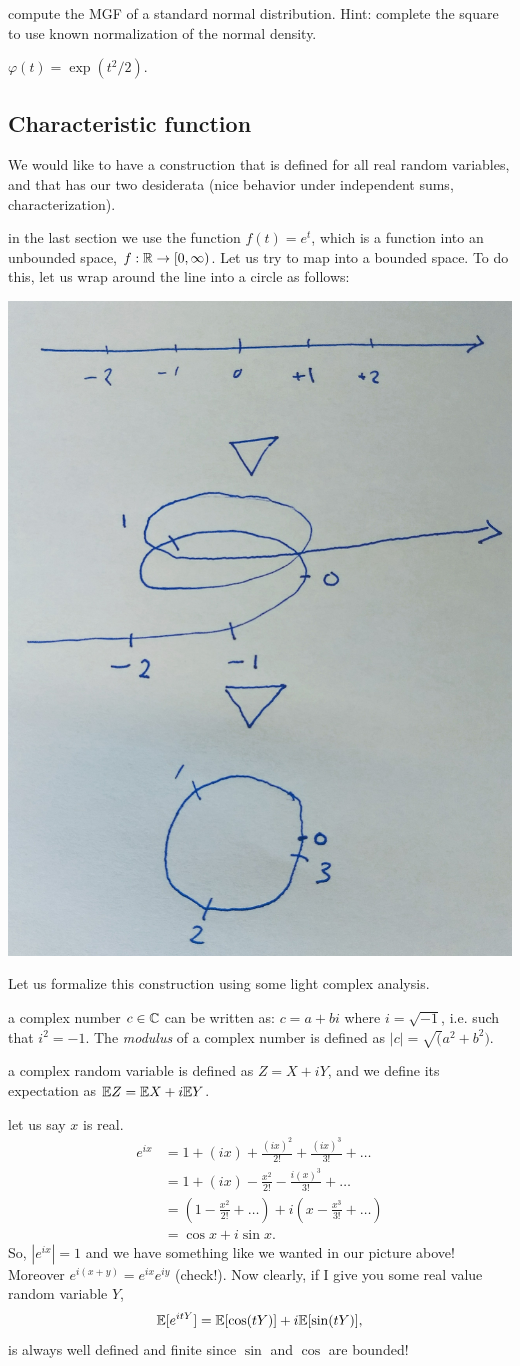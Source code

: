 \documentclass{article}
\begin{document}
 compute the MGF of a standard normal distribution. Hint: complete the square to use known normalization of the normal density.

 $\varphi(t) = \exp(t^2 / 2)$. 


\subsection{Characteristic function}

We would like to have a construction that is defined for all real random variables, and that has our two desiderata (nice behavior under independent sums, characterization). 

 in the last section we use the function $f(t) = e^t$, which is a function into an unbounded space, $f : {\mathbb R} \to [0, \infty)$. Let us try to map into a bounded space. To do this, let us wrap around the line into a circle as follows:
\begin{center}
	\includegraphics[width=0.3\linewidth]{figures/ch-fct} 
\end{center}
Let us formalize this construction using some light complex analysis.

 a complex number $c \in {\mathbb C}$ can be written as: $c = a + b i$ where $i = \sqrt{-1}$, i.e. such that $i^2 = -1$. The \emph{modulus} of a complex number is defined as $|c| = \sqrt(a^2 + b^2)$. 

 a complex random variable is defined as $Z = X + iY$, and we define its expectation as ${\mathbb E} Z = {\mathbb E} X + i{\mathbb E} Y$.

 let us say $x$ is real.  
\begin{align*}
	e^{ix} &= 1 + (ix) + \frac{(ix)^2}{2!} + \frac{(ix)^3}{3!} + \dots \\
	&= 1 + (ix) - \frac{x^2}{2!} - \frac{i(x)^3}{3!} + \dots \\
	&= (1 - \frac{x^2}{2!} + \dots) + i(x - \frac{x^3}{3!} + \dots) \\
	&= \cos x + i \sin x.
\end{align*}
So, $|e^{ix}| = 1$ and we have something like we wanted in our picture above! Moreover $e^{i(x+y)} = e^{ix} e^{iy}$ (check!). Now clearly, if I give you some real value random variable $Y$,
\[ {\mathbb E}[e^{itY}] = {\mathbb E}[\cos(tY)] + i {\mathbb E}[\sin(tY)], \]
is always well defined and finite since $\sin$ and $\cos$ are bounded!
\end{document}
